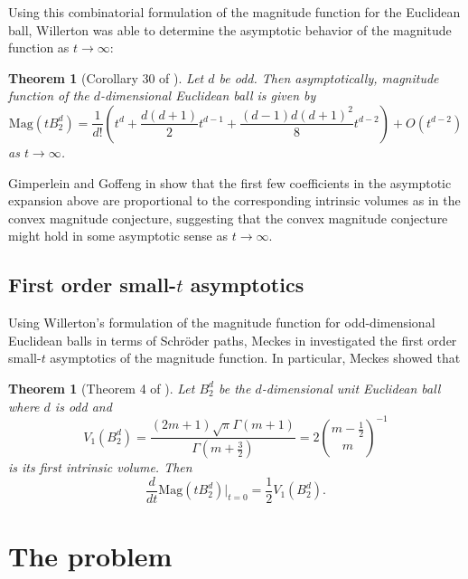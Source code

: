 \documentclass[11pt]{article}
\theoremstyle{mythm}
\newtheorem{theo}[defn]{Theorem}
\begin{document}
Using this combinatorial formulation of the magnitude function for the Euclidean ball, Willerton was able to determine the asymptotic behavior of the magnitude function as $t\to\infty$:

\begin{theo}[Corollary 30 of \cite{willerton_magnitude_2017}]\label{theo:largetasymptotics}
Let $d$ be odd. Then asymptotically, magnitude function of the $d$-dimensional Euclidean ball is given by
\begin{equation*}
\text{Mag}\left(tB_2^d\right) = \frac{1}{d!}\left(t^d + \frac{d(d+1)}{2}t^{d-1} + \frac{(d-1)d(d+1)^2}{8}t^{d-2}\right) + O(t^{d-2})
\end{equation*}
as $t\to\infty$.
\end{theo}

Gimperlein and Goffeng in \cite{gimperlein_magnitude_2017} show that the first few coefficients in the asymptotic expansion above are proportional to the corresponding intrinsic volumes as in the convex magnitude conjecture, suggesting that the convex magnitude conjecture might hold in some asymptotic sense as $t\to\infty$.

\subsection{First order small-$t$ asymptotics}

Using Willerton's formulation of the magnitude function for odd-dimensional Euclidean balls in terms of Schröder paths, Meckes in \cite{meckes_magnitude_2019} investigated the first order small-$t$ asymptotics of the magnitude function. In particular, Meckes showed that

\begin{theo}[Theorem 4 of \cite{meckes_magnitude_2019}]\label{theo:firstorder}
Let $B_2^d$ be the $d$-dimensional unit Euclidean ball where $d$ is odd and
\begin{equation*}
V_1\left(B_2^d\right) = \frac{(2m+1)\sqrt{\pi}\Gamma(m+1)}{\Gamma\left(m+\frac{3}{2}\right)} = 2\binom{m-\frac{1}{2}}{m}^{-1}
\end{equation*}
is its first intrinsic volume. Then
\begin{equation*}
\frac{d}{dt}\text{Mag}(tB_2^d)\big\vert_{t=0} = \frac{1}{2}V_1(B_2^d).
\end{equation*}
\end{theo}

\section{The problem}
\end{document}
